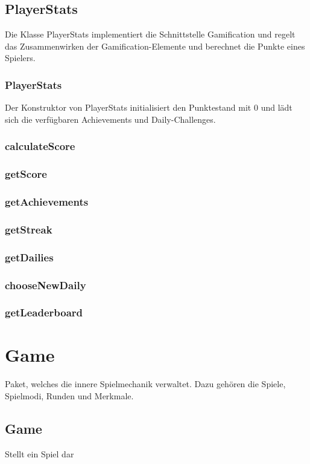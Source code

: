 \documentclass[a4paper]{scrreprt}
\begin{document}
   
   \subsection{PlayerStats}
   Die Klasse PlayerStats implementiert die Schnittstelle Gamification und regelt das Zusammenwirken der Gamification-Elemente und berechnet die Punkte eines Spielers.
   \subsubsection{PlayerStats}
   Der Konstruktor von PlayerStats initialisiert den Punktestand mit 0 und lädt sich die verfügbaren Achievements und Daily-Challenges.
   \subsubsection{calculateScore}
   \subsubsection{getScore}
   \subsubsection{getAchievements}
   \subsubsection{getStreak}
   \subsubsection{getDailies}
   \subsubsection{chooseNewDaily}
   \subsubsection{getLeaderboard}
   
   
   \section{Game}
   Paket, welches die innere Spielmechanik verwaltet. Dazu gehören die Spiele, Spielmodi, Runden und Merkmale.
   
   \subsection{Game}
   Stellt ein Spiel dar
\end{document}
